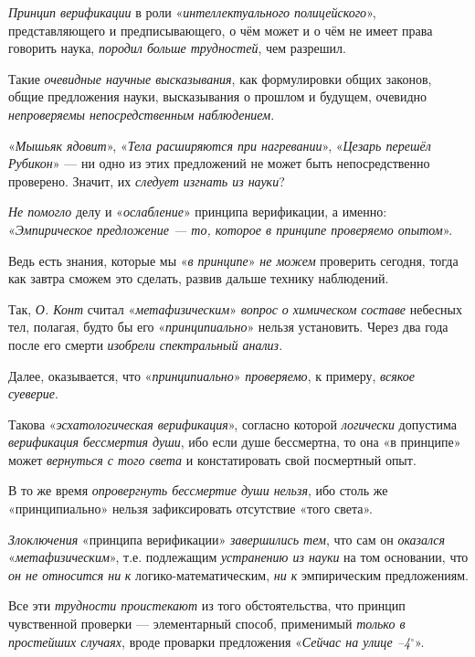 \documentclass[a4paper,14pt,russian]{extreport}
\begin{document}
\emph{Принцип верификации} в роли «\emph{интеллектуального полицейского}», представляющего и предписывающего, о чём может и о чём не имеет права говорить наука, \emph{породил больше трудностей}, чем разрешил.

Такие \emph{очевидные научные высказывания}, как формулировки общих законов, общие предложения науки, высказывания о прошлом и будущем, очевидно \emph{непроверяемы непосредственным наблюдением}.

«\emph{Мышьяк ядовит}», «\emph{Тела расширяются при нагревании}», «\emph{Цезарь перешёл Рубикон}» --- ни одно из этих предложений не может быть непосредственно проверено. Значит, их \emph{следует изгнать из науки}?

\emph{Не помогло} делу и «\emph{ослабление}» принципа верификации, а именно: «\emph{Эмпирическое предложение --- то, которое в принципе проверяемо опытом}».

Ведь есть знания, которые мы «\emph{в принципе}» \emph{не можем} проверить сегодня, тогда как завтра сможем это сделать, развив дальше технику наблюдений.

Так, \emph{О. Конт} считал «\emph{метафизическим}» \emph{вопрос о химическом составе} небесных тел, полагая, будто бы его «\emph{принципиально}» нельзя установить. Через два года после его смерти \emph{изобрели спектральный анализ.}

Далее, оказывается, что «\emph{принципиально}» \emph{проверяемо}, к примеру, \emph{всякое суеверие}.

Такова «\emph{эсхатологическая верификация}», согласно которой \emph{логически} допустима \emph{верификация бессмертия души}, ибо если душе бессмертна, то она «в принципе» может \emph{вернуться с того света} и констатировать свой посмертный опыт.

В то же время \emph{опровергнуть бессмертие души нельзя}, ибо столь же «принципиально» нельзя зафиксировать отсутствие «того света».

\emph{Злоключения} «принципа верификации» \emph{завершились тем}, что сам он \emph{оказался} «\emph{метафизическим}», т.е. подлежащим \emph{устранению из науки} на том основании, что \emph{он не относится ни} \emph{к} логико-математическим, \emph{ни к} эмпирическим предложениям.

Все эти \emph{трудности проистекают} из того обстоятельства, что принцип чувственной проверки --- элементарный способ, применимый \emph{только в простейших случаях}, вроде проварки предложения «\emph{Сейчас на улице --4}$^{\circ}$».
\end{document}
